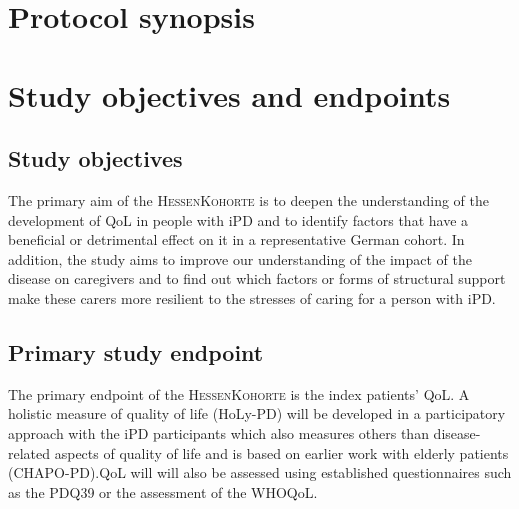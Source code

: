 
\section{Protocol synopsis}
\newpage


\section{Study objectives and endpoints}
\subsection{Study objectives}
The primary aim of the \textsc{HessenKohorte} is to deepen the understanding of the development of \ac{QoL} in people with \ac{iPD} and to identify factors that have a beneficial or detrimental effect on it in a representative German cohort. In addition, the study aims to improve our understanding of the impact of the disease on caregivers and to find out which factors or forms of structural support make these carers more resilient to the stresses of caring for a person with \ac{iPD}.

\subsection{Primary study endpoint}
The primary endpoint of the \textsc{HessenKohorte} is the index patients' \ac{QoL}. A holistic measure of quality of life (\ac{HoLy-PD}) will be developed in a participatory approach with the \ac{iPD} participants which also measures others than disease-related aspects of quality of life and is based on earlier work with elderly patients (\acs{CHAPO-PD}).\ac{QoL} will will also be assessed using established questionnaires such as the \ac{PDQ39}\citep{jenkinson1997pdq39} or the assessment of the \ac{WHOQoL}\citep{group1998world}.

